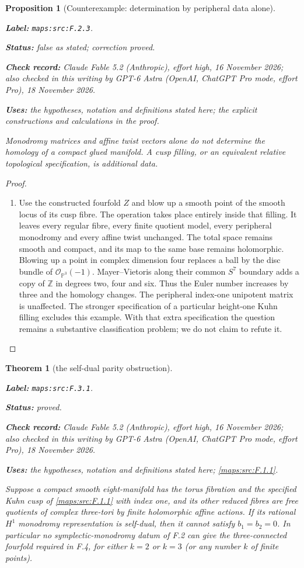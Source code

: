 \documentclass[11pt,a4paper]{article}
\newtheorem{theorem}{Theorem}[section]
\newtheorem{proposition}[proposition]{Proposition}
\theoremstyle{definition}
\newcommand{\StatementRecord}[4]{\par\smallskip\begingroup\upshape\raggedright\noindent\textbf{Label:} \nolinkurl{#1}.\par\noindent\textbf{Status:} #2.\par\noindent\textbf{Check record:} #3.\par\noindent\textbf{Uses:} #4.\par\endgroup\smallskip}
\newcommand{\CurrentChecker}{GPT-6 Astra (OpenAI, ChatGPT Pro mode, effort Pro), 18 November 2026}
\begin{document}
\begin{proposition}[Counterexample: determination by peripheral data alone]\label{maps:src:F.2.3}
\StatementRecord{maps:src:F.2.3}{false as stated; correction proved}{Claude Fable 5.2 (Anthropic), effort high, 16 November 2026; also checked in this writing by \CurrentChecker}{the hypotheses, notation and definitions stated here; the explicit constructions and calculations in the proof}


Monodromy matrices and affine twist vectors alone do not
determine the homology of a compact glued manifold.  A cusp
filling, or an equivalent relative topological specification,
is additional data.

\end{proposition}


\begin{proof}
\begin{enumerate}[label=\arabic*.]
\item Use the constructed fourfold $Z$ and blow up a smooth point
of the smooth locus of its cusp fibre.  The operation takes
place entirely inside that filling.  It leaves every regular
fibre, every finite quotient model, every peripheral monodromy
and every affine twist unchanged.  The total space remains
smooth and compact, and its map to the same base remains
holomorphic.  Blowing up a point in complex dimension four
replaces a ball by the disc bundle of $\mathcal O_{\mathbb P^3}(-1)$.
Mayer--Vietoris along their common $S^7$ boundary adds a copy
of $\mathbb Z$ in degrees two, four and six.  Thus the Euler
number increases by three and the homology changes.  The
peripheral index-one unipotent matrix is unaffected.
The stronger specification of a particular height-one Kuhn
filling excludes this example.  With that extra specification
the question remains a substantive classification problem;
we do not claim to refute it.

\end{enumerate}
\end{proof}




\begin{theorem}[the self-dual parity obstruction]\label{maps:src:F.3.1}
\StatementRecord{maps:src:F.3.1}{proved}{Claude Fable 5.2 (Anthropic), effort high, 16 November 2026; also checked in this writing by \CurrentChecker}{the hypotheses, notation and definitions stated here; \cref{maps:src:F.1.1}}


Suppose a compact smooth eight-manifold has the torus fibration
and the specified Kuhn cusp of \ref{maps:src:F.1.1} with index one, and its
other reduced fibres are free quotients of complex three-tori
by finite holomorphic affine actions.  If its rational
$H^1$ monodromy representation is self-dual, then it cannot
satisfy $b_1=b_2=0$.  In particular no symplectic-monodromy
datum of F.2 can give the three-connected fourfold required
in F.4, for either $k=2$ or $k=3$ (or any number $k$ of finite
points).

\end{theorem}
\end{document}
